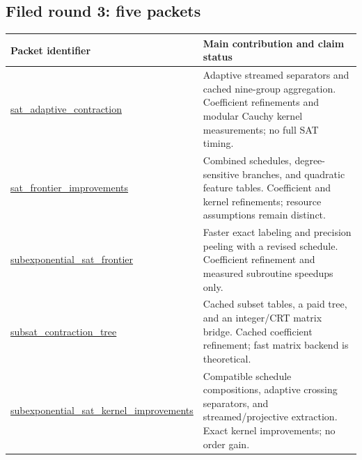 \subsection*{Filed round 3: five packets}
\begin{longtable}{>{\raggedright\arraybackslash}p{4.9cm}>{\raggedright\arraybackslash}p{10cm}}
\toprule Packet identifier & Main contribution and claim status\\
\midrule\endhead
\bottomrule\endfoot
\href{https://github.com/VladimirReshetnikov/ProveIt/tree/8e76d515063c4b9fbd8743a846b457e3a01bc039/Computability/SubexponentialSAT/Research/sat_adaptive_contraction}{\textsf{sat\_\allowbreak adaptive\_\allowbreak contraction}} & Adaptive streamed separators and cached nine-group aggregation. Coefficient refinements and modular Cauchy kernel measurements; no full SAT timing.\\[3pt]
\href{https://github.com/VladimirReshetnikov/ProveIt/tree/8e76d515063c4b9fbd8743a846b457e3a01bc039/Computability/SubexponentialSAT/Research/sat_frontier_improvements}{\textsf{sat\_\allowbreak frontier\_\allowbreak improvements}} & Combined schedules, degree-sensitive branches, and quadratic feature tables. Coefficient and kernel refinements; resource assumptions remain distinct.\\[3pt]
\href{https://github.com/VladimirReshetnikov/ProveIt/tree/8e76d515063c4b9fbd8743a846b457e3a01bc039/Computability/SubexponentialSAT/Research/subexponential_sat_frontier}{\textsf{subexponential\_\allowbreak sat\_\allowbreak frontier}} & Faster exact labeling and precision peeling with a revised schedule. Coefficient refinement and measured subroutine speedups only.\\[3pt]
\href{https://github.com/VladimirReshetnikov/ProveIt/tree/8e76d515063c4b9fbd8743a846b457e3a01bc039/Computability/SubexponentialSAT/Research/subsat_contraction_tree}{\textsf{subsat\_\allowbreak contraction\_\allowbreak tree}} & Cached subset tables, a paid tree, and an integer/CRT matrix bridge. Cached coefficient refinement; fast matrix backend is theoretical.\\[3pt]
\href{https://github.com/VladimirReshetnikov/ProveIt/tree/8e76d515063c4b9fbd8743a846b457e3a01bc039/Computability/SubexponentialSAT/Research/subexponential_sat_kernel_improvements}{\textsf{subexponential\_\allowbreak sat\_\allowbreak kernel\_\allowbreak improvements}} & Compatible schedule compositions, adaptive crossing separators, and streamed/projective extraction. Exact kernel improvements; no order gain.\\[3pt]
\end{longtable}

